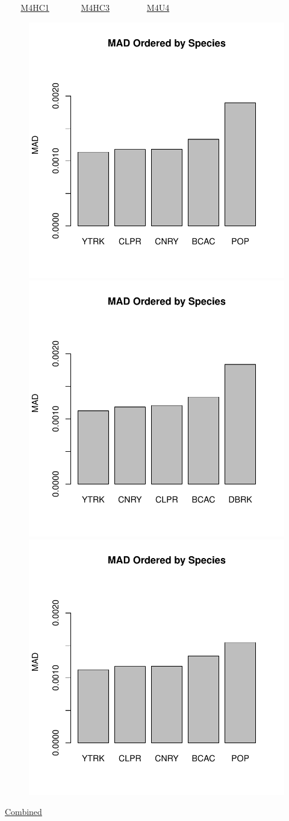 \documentclass[ xcolor = pdftex, dvipsnames, table ]{beamer}
\begin{document}
\begin{frame}{$~~~~~~~$ \href{https://github.com/gasduster99/sppComp/tree/master/sscRuns/26919781982M4HC1}{M4HC1} $~~~~~~~~~~~~~~$ \href{https://github.com/gasduster99/sppComp/tree/master/sscRuns/26919781982M4HC3}{M4HC3} $~~~~~~~~~~~~~~~~~$ \href{https://github.com/gasduster99/sppComp/tree/master/sscRuns/26919781982M4U4}{M4U4} }
        \begin{figure}[ht!]
        \centering
        \hspace*{-1cm}
        \includegraphics[width=.4\textwidth]{../sscRuns/26919781982M4HC1/sppHeadMad68.pdf}
        \includegraphics[width=.4\textwidth]{../sscRuns/26919781982M4HC3/sppHeadMad68.pdf}
        \includegraphics[width=.4\textwidth]{../sscRuns/26919781982M4U4/sppHeadMad68.pdf}
        \end{figure}
	\vspace{-1cm}
	\begin{center}
	\Large
	\href{https://github.com/gasduster99/sppComp/tree/master/try1/postSSC/26919781982M4HC1HC3U4}{Combined}
	\end{center}
\end{frame}
\end{document}
